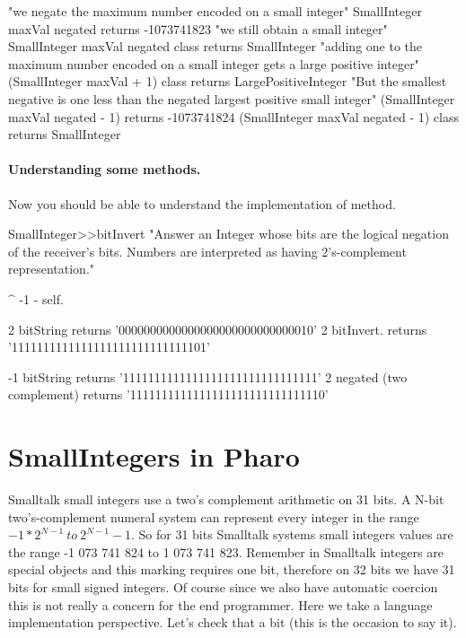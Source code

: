 \documentclass[a4paper,10pt,twoside]{book}
\begin{document}
\begin{code}{} 
"we negate the maximum number encoded on a small integer"
SmallInteger maxVal negated	 
	  	returns -1073741823
"we still obtain a small integer"		
SmallInteger maxVal negated class
		returns SmallInteger
"adding one to the maximum number encoded on a small integer gets a large positive integer"
(SmallInteger maxVal + 1) class
		returns LargePositiveInteger		
"But the smallest negative is one less than the negated largest positive small integer"		
(SmallInteger maxVal negated - 1) 
		returns -1073741824 
(SmallInteger maxVal negated - 1) class 
		returns SmallInteger 		 
\end{code}


\paragraph{Understanding some methods.}
Now you should be able to understand the implementation of  method.

\begin{code}{}
SmallInteger>>bitInvert
    "Answer an Integer whose bits are the logical negation of the receiver's bits.
    Numbers are interpreted as having 2's-complement representation."

	^ -1 - self.
\end{code}

\begin{code}{}
2 bitString
	returns '0000000000000000000000000000010'
2 bitInvert.
	returns '1111111111111111111111111111101'
	
-1 bitString
	returns '1111111111111111111111111111111'
2 negated (two complement)
	returns '1111111111111111111111111111110'
\end{code}


\section{SmallIntegers in Pharo}

Smalltalk small integers use a two's complement arithmetic on 31 bits.  A N-bit two's-complement numeral system can represent every integer in the range $-1 * 2^{N-1}\ to\ 2^{N-1}-1$. So for 31 bits Smalltalk systems small integers values are the range -1 073 741 824 to  1 073 741 823.  Remember in Smalltalk integers are special objects and this marking requires one bit, therefore on 32 bits we have 31 bits for small signed integers. Of course since we also have automatic coercion this is not really a concern for the end programmer. Here we take a language implementation perspective.
 Let's check that a bit (this is the occasion to say it). 
\end{document}
